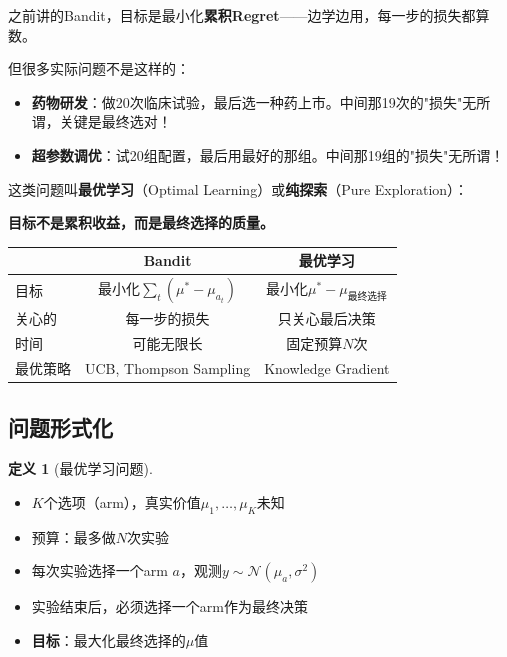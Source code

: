 \documentclass[11pt,a4paper]{article}
\theoremstyle{definition}
\newtheorem{definition}{定义}[section]
\begin{document}
\begin{plainwords}
之前讲的Bandit，目标是最小化\textbf{累积Regret}——边学边用，每一步的损失都算数。

但很多实际问题不是这样的：

\begin{itemize}
    \item \textbf{药物研发}：做20次临床试验，最后选一种药上市。中间那19次的"损失"无所谓，关键是最终选对！
    \item \textbf{超参数调优}：试20组配置，最后用最好的那组。中间那19组的"损失"无所谓！
\end{itemize}

这类问题叫\textbf{最优学习}（Optimal Learning）或\textbf{纯探索}（Pure Exploration）：

\textbf{目标不是累积收益，而是最终选择的质量。}
\end{plainwords}

\begin{keypoint}
\begin{center}
\begin{tabular}{l|c|c}
\toprule
& Bandit & 最优学习 \\
\midrule
目标 & 最小化$\sum_t (\mu^* - \mu_{a_t})$ & 最小化$\mu^* - \mu_{\text{最终选择}}$ \\
关心的 & 每一步的损失 & 只关心最后决策 \\
时间 & 可能无限长 & 固定预算$N$次 \\
最优策略 & UCB, Thompson Sampling & Knowledge Gradient \\
\bottomrule
\end{tabular}
\end{center}
\end{keypoint}

\subsection{问题形式化}

\begin{definition}[最优学习问题]
\begin{itemize}
    \item $K$个选项（arm），真实价值$\mu_1, \ldots, \mu_K$未知
    \item 预算：最多做$N$次实验
    \item 每次实验选择一个arm $a$，观测$y \sim \mathcal{N}(\mu_a, \sigma^2)$
    \item 实验结束后，必须选择一个arm作为最终决策
    \item \textbf{目标}：最大化最终选择的$\mu$值
\end{itemize}
\end{definition}
\end{document}
